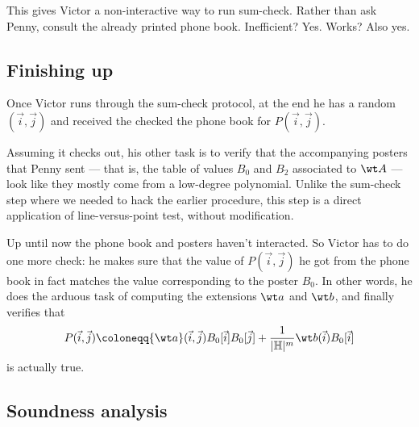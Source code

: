\documentclass[11pt]{scrreprt}
\newcommand{\HH}{\mathbb H}
\begin{document}
This gives Victor a non-interactive way to run sum-check.
Rather than ask Penny, consult the already printed phone book.
Inefficient? Yes. Works? Also yes.

\subsection{Finishing up}
Once Victor runs through the sum-check protocol,
at the end he has a random $(\vec i, \vec j)$ and received
the checked the phone book for $P(\vec i, \vec j)$.

Assuming it checks out, his other task is to
verify that the accompanying posters that Penny sent ---
that is, the table of values $B_0$ and $B_2$ associated to $\wt A$ ---
look like they mostly come from a low-degree polynomial.
Unlike the sum-check step where we needed to hack the earlier procedure,
this step is a direct application of line-versus-point test, without modification.

Up until now the phone book and posters haven't interacted.
So Victor has to do one more check:
he makes sure that the value of $P(\vec i, \vec j)$ he got from the phone book
in fact matches the value corresponding to the poster $B_0$.
In other words, he does the arduous task of computing the extensions
$\wt a$ and $\wt b$, and finally verifies that
\[
  P(\vec i, \vec j) \coloneqq
  {\wt a}(\vec i, \vec j) B_0[\vec i] B_0[\vec j]
  + \frac{1}{|\HH|^m} \wt b(\vec i) B_0[\vec i]
\]
is actually true.

\subsection{Soundness analysis}
\end{document}
